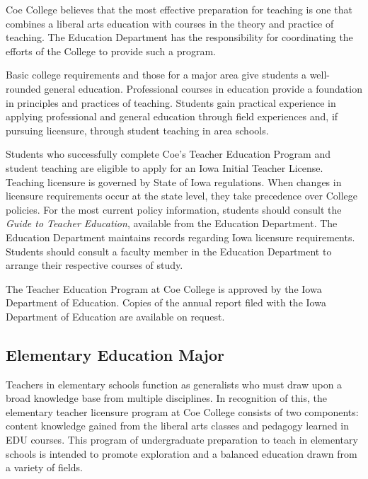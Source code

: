 \documentclass[
  letterpaper,
]{scrbook}
\begin{document}
Coe College believes that the most effective preparation for teaching is
one that combines a liberal arts education with courses in the theory
and practice of teaching. The Education Department has the
responsibility for coordinating the efforts of the College to provide
such a program.

Basic college requirements and those for a major area give students a
well-rounded general education. Professional courses in education
provide a foundation in principles and practices of teaching. Students
gain practical experience in applying professional and general education
through field experiences and, if pursuing licensure, through student
teaching in area schools.

Students who successfully complete Coe's Teacher Education Program and
student teaching are eligible to apply for an Iowa Initial Teacher
License. Teaching licensure is governed by State of Iowa regulations.
When changes in licensure requirements occur at the state level, they
take precedence over College policies. For the most current policy
information, students should consult the \emph{Guide to Teacher
Education}, available from the Education Department. The Education
Department maintains records regarding Iowa licensure requirements.
Students should consult a faculty member in the Education Department to
arrange their respective courses of study.

The Teacher Education Program at Coe College is approved by the Iowa
Department of Education. Copies of the annual report filed with the Iowa
Department of Education are available on request.

\subsection{Elementary Education
Major}\label{elementary-education-major}

Teachers in elementary schools function as generalists who must draw
upon a broad knowledge base from multiple disciplines. In recognition of
this, the elementary teacher licensure program at Coe College consists
of two components: content knowledge gained from the liberal arts
classes and pedagogy learned in EDU courses. This program of
undergraduate preparation to teach in elementary schools is intended to
promote exploration and a balanced education drawn from a variety of
fields.
\end{document}
